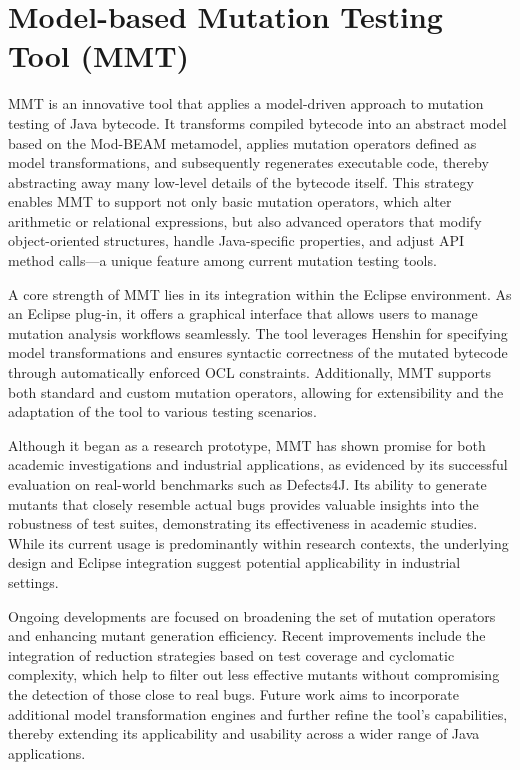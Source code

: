 \documentclass[sigplan, nonacm]{acmart}
\begin{document}
\section{Model-based Mutation Testing Tool (MMT)}

MMT is an innovative tool that applies a model-driven approach to mutation
testing of Java bytecode. It transforms compiled bytecode into an abstract
model based on the Mod-BEAM metamodel, applies mutation operators defined as
model transformations, and subsequently regenerates executable code, thereby
abstracting away many low-level details of the bytecode itself. This strategy
enables MMT to support not only basic mutation operators, which alter
arithmetic or relational expressions, but also advanced operators that modify
object-oriented structures, handle Java-specific properties, and adjust API
method calls—a unique feature among current mutation testing tools.

A core strength of MMT lies in its integration within the Eclipse
environment. As an Eclipse plug-in, it offers a graphical interface that
allows users to manage mutation analysis workflows seamlessly. The tool
leverages Henshin for specifying model transformations and ensures syntactic
correctness of the mutated bytecode through automatically enforced OCL
constraints. Additionally, MMT supports both standard and custom mutation
operators, allowing for extensibility and the adaptation of the tool to
various testing scenarios.

Although it began as a research prototype, MMT has shown promise for both
academic investigations and industrial applications, as evidenced by its
successful evaluation on real-world benchmarks such as Defects4J. Its ability
to generate mutants that closely resemble actual bugs provides valuable
insights into the robustness of test suites, demonstrating its effectiveness
in academic studies. While its current usage is predominantly within research
contexts, the underlying design and Eclipse integration suggest potential
applicability in industrial settings.

Ongoing developments are focused on broadening the set of mutation operators
and enhancing mutant generation efficiency. Recent improvements include the
integration of reduction strategies based on test coverage and cyclomatic
complexity, which help to filter out less effective mutants without
compromising the detection of those close to real bugs. Future work aims to
incorporate additional model transformation engines and further refine the
tool's capabilities, thereby extending its applicability and usability across
a wider range of Java applications.
\end{document}
